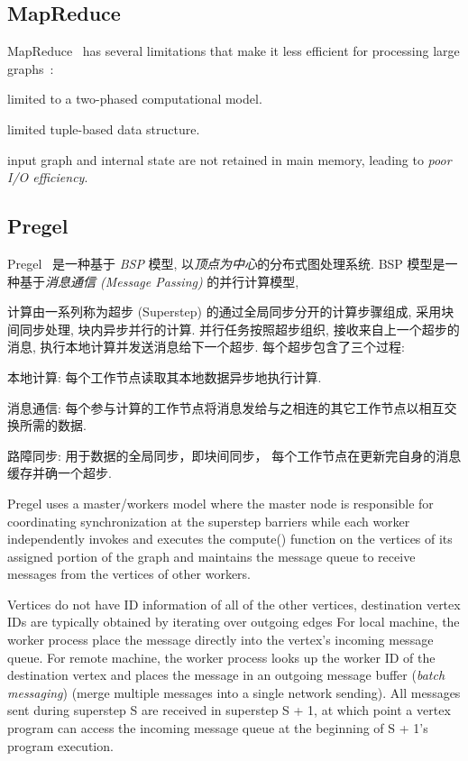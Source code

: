 \documentclass[UTF8,12pt,a4paper]{article}
\begin{document}
\subsection{MapReduce}
MapReduce~\cite{DBLP:conf/osdi/DeanG04}
has several limitations that make it less efficient
for processing large graphs~\cite{DBLP:journals/csur/HeidariSCB18}:
\begin{compactitem}
  \item limited to a two-phased computational model.
  \item limited tuple-based data structure.
  \item input graph and internal state are not retained in main memory,
  leading to \textit{poor I/O efficiency}.
\end{compactitem}

\subsection{Pregel}
Pregel~\cite{DBLP:conf/sigmod/MalewiczABDHLC10}
是一种基于 \textit{BSP} 模型, 以\textit{顶点为中心}的分布式图处理系统.
BSP 模型是一种基于\textit{消息通信 (Message Passing) }的并行计算模型,

计算由一系列称为超步 (Superstep) 的通过全局同步分开的计算步骤组成,
采用块间同步处理, 块内异步并行的计算.
并行任务按照超步组织, 接收来自上一个超步的消息, 执行本地计算并发送消息给下一个超步.
每个超步包含了三个过程:
\begin{compactitem}
  \item 本地计算: 每个工作节点读取其本地数据异步地执行计算.
  \item 消息通信: 
  每个参与计算的工作节点将消息发给与之相连的其它工作节点以相互交换所需的数据.
  \item 路障同步: 用于数据的全局同步，即块间同步，
  每个工作节点在更新完自身的消息缓存并确一个超步.
\end{compactitem}

Pregel uses a master/workers model where
the master node is responsible for coordinating synchronization at the superstep barriers
while each worker independently invokes and executes the compute() function
on the vertices of its assigned portion of the graph
and maintains the message queue to receive messages from the vertices of other workers.

Vertices do not have ID information of all of the other vertices,
destination vertex IDs are typically obtained by iterating over outgoing edges
For local machine, the worker process place the message
directly into the vertex’s incoming message queue.
For remote machine, the worker process looks up the worker ID of the destination vertex
and places the message in an outgoing message buffer (\textit{batch messaging})
(merge multiple messages into a single network sending).
All messages sent during superstep S are received in superstep S + 1,
at which point a vertex program can access the incoming message queue
at the beginning of S + 1’s program execution.
\end{document}
